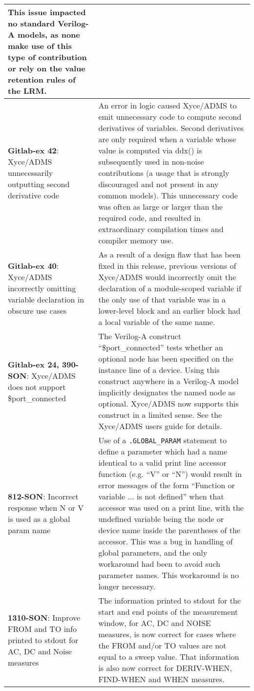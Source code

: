 {\begin{longtable}[h] {>{\raggedright\small}m{2in}|>{\raggedright\let\\\tabularnewline\small}m{3.5in}}
This issue impacted no standard Verilog-A models, as none make use of
this type of contribution or rely on the value retention rules of the LRM.
\\ \hline

\textbf{Gitlab-ex 42}: Xyce/ADMS unnecessarily outputting second derivative code &
An error in logic caused Xyce/ADMS to emit unnecessary code to compute
second derivatives of variables.  Second derivatives are only required
when a variable whose value is computed via ddx() is subsequently used
in non-noise contributions (a usage that is strongly discouraged and
not present in any common models).  This unnecessary code was often as
large or larger than the required code, and resulted in extraordinary
compilation times and compiler memory use. \\ \hline
\textbf{Gitlab-ex 40}: Xyce/ADMS incorrectly omitting variable declaration in obscure use cases &
As a result of a design flaw that has been fixed in this release,
previous versions of Xyce/ADMS would incorrectly omit the declaration
of a module-scoped variable if the only use of that variable was in a
lower-level block and an earlier block had a local variable of the
same name. \\ \hline
\textbf{Gitlab-ex 24, 390-SON}: Xyce/ADMS does not support \$port\_connected &
The Verilog-A construct ``\$port\_connected'' tests whether an
optional node has been specified on the instance line of a device.
Using this construct anywhere in a Verilog-A model implicitly
designates the named node as optional.  Xyce/ADMS now supports this
construct in a limited sense.  See the Xyce/ADMS users guide for
details. \\ \hline
\textbf{812-SON}: Incorrect response when N or V is used as a global param name &
Use of a \texttt{.GLOBAL\_PARAM} statement to define a parameter which
had a name identical to a valid print line accessor function
(e.g. ``V'' or ``N'') would result in error messages of the form
``Function or variable ... is not defined'' when that accessor was
used on a print line, with the undefined variable being the node or
device name inside the parentheses of the accessor.  This was a bug in
handling of global parameters, and the only workaround had been to
avoid such parameter names.  This workaround is no longer
necessary. \\ \hline

\textbf{1310-SON}: Improve FROM and TO info printed to stdout for AC,
DC and Noise measures & The information printed to stdout for the
start and end points of the measurement window, for AC, DC and NOISE
measures, is now correct for cases where the FROM and/or TO values
are not equal to a sweep value.  That information is also now
correct for DERIV-WHEN, FIND-WHEN and WHEN measures.
\\ \hline


\end{longtable}}
